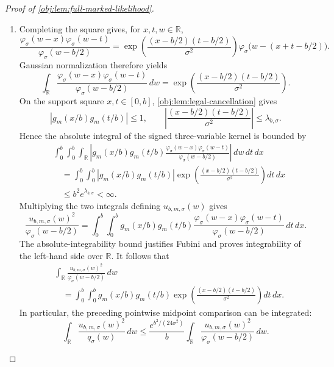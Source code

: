 \documentclass[11pt]{article}
\begin{document}
\begin{proof}[Proof of \cref{obj:lem:full-marked-likelihood}]
\begin{enumerate}
\item Completing the square gives, for \(x,t,w\in\mathbb R\),
\[
\frac{\varphi_\sigma(w-x)\varphi_\sigma(w-t)}
     {\varphi_\sigma(w-b/2)}
=
\exp\!\left(\frac{(x-b/2)(t-b/2)}{\sigma^2}\right)
\varphi_\sigma\bigl(w-(x+t-b/2)\bigr).
\]
Gaussian normalization therefore yields
\[
\int_{\mathbb R}
\frac{\varphi_\sigma(w-x)\varphi_\sigma(w-t)}
     {\varphi_\sigma(w-b/2)}\,dw
=
\exp\!\left(\frac{(x-b/2)(t-b/2)}{\sigma^2}\right).
\]
On the support square \(x,t\in[0,b]\), \cref{obj:lem:legal-cancellation} gives
\[
|g_m(x/b)g_m(t/b)|\le1,
\qquad
\left|\frac{(x-b/2)(t-b/2)}{\sigma^2}\right|
\le\lambda_{b,\sigma}.
\]
Hence the absolute integral of the signed three-variable kernel is bounded by
\[
\begin{aligned}
&\int_0^b\int_0^b\int_{\mathbb R}
\left|
g_m(x/b)g_m(t/b)
\frac{\varphi_\sigma(w-x)\varphi_\sigma(w-t)}
     {\varphi_\sigma(w-b/2)}
\right|\,dw\,dt\,dx\\
&\quad=
\int_0^b\int_0^b
|g_m(x/b)g_m(t/b)|
\exp\!\left(\frac{(x-b/2)(t-b/2)}{\sigma^2}\right)dt\,dx\\
&\quad\le b^2e^{\lambda_{b,\sigma}}<\infty.
\end{aligned}
\]
Multiplying the two integrals defining \(u_{b,m,\sigma}(w)\) gives
\[
\frac{u_{b,m,\sigma}(w)^2}{\varphi_\sigma(w-b/2)}
=
\int_0^b\int_0^b
g_m(x/b)g_m(t/b)
\frac{\varphi_\sigma(w-x)\varphi_\sigma(w-t)}
     {\varphi_\sigma(w-b/2)}\,dt\,dx.
\]
The absolute-integrability bound justifies Fubini and proves integrability of the left-hand side over \(\mathbb R\). It follows that
\[
\begin{aligned}
&\int_{\mathbb R}
\frac{u_{b,m,\sigma}(w)^2}{\varphi_\sigma(w-b/2)}\,dw\\
&\quad=
\int_0^b\int_0^b
g_m(x/b)g_m(t/b)
\exp\!\left(\frac{(x-b/2)(t-b/2)}{\sigma^2}\right)dt\,dx.
\end{aligned}
\]
In particular, the preceding pointwise midpoint comparison can be integrated:
\[
\int_{\mathbb R}\frac{u_{b,m,\sigma}(w)^2}{q_\sigma(w)}\,dw
\le
\frac{e^{b^2/(24\sigma^2)}}b
\int_{\mathbb R}
\frac{u_{b,m,\sigma}(w)^2}{\varphi_\sigma(w-b/2)}\,dw.
\]


\end{enumerate}
\end{proof}
\end{document}
